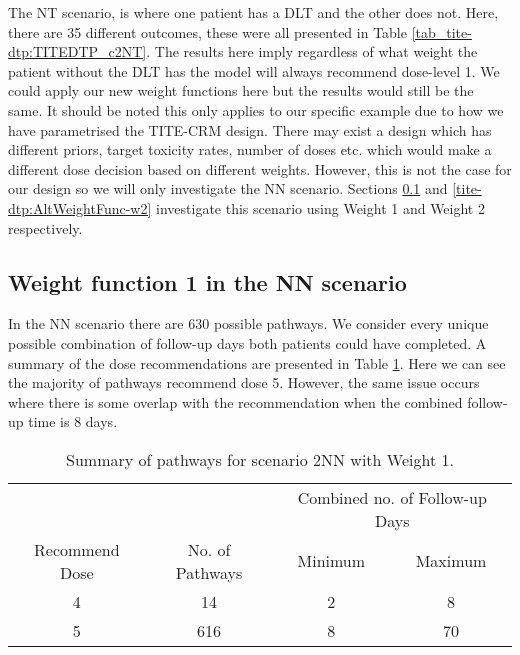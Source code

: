 The NT scenario, is where one patient has a DLT and the other does not. Here, there are 35 different outcomes, these were all presented in Table \ref{tab_tite-dtp:TITEDTP_c2NT}. The results here imply regardless of what weight the patient without the DLT has the model will always recommend dose-level 1. We could apply our new weight functions here but the results would still be the same. It should be noted this only applies to our specific example due to how we have parametrised the TITE-CRM design. There may exist a design which has different priors, target toxicity rates, number of doses etc. which would make a different dose decision based on different weights. However, this is not the case for our design so we will only investigate the NN scenario. Sections \ref{tite-dtp:AltWeightFunc-w1} and \ref{tite-dtp:AltWeightFunc-w2} investigate this scenario using Weight 1 and Weight 2 respectively.  


\subsection{Weight function 1 in the NN scenario}
\label{tite-dtp:AltWeightFunc-w1}

In the NN scenario there are 630 possible pathways. We consider every unique possible combination of follow-up days both patients could have completed. A summary of the dose recommendations are presented in Table \ref{tab_tite-dtp:AltWeightW1Summ}. Here we can see the majority of pathways recommend dose 5. However, the same issue occurs where there is some overlap with the recommendation when the combined follow-up time is 8 days.

\begin{table}[H]
	\centering
	\caption{Summary of pathways for scenario 2NN with Weight 1.}
	\label{tab_tite-dtp:AltWeightW1Summ}
	\begin{tabular}{cccc}
		\hline
		\multicolumn{1}{l}{} & \multicolumn{1}{l}{} & \multicolumn{2}{c}{Combined no. of Follow-up Days} \\ \cline{3-4} 
		Recommend Dose & No. of Pathways & Minimum & Maximum \\ \hline
		4              & 14             & 2       & 8      \\
		5              & 616             & 8      & 70      \\ \hline
	\end{tabular}
\end{table}

